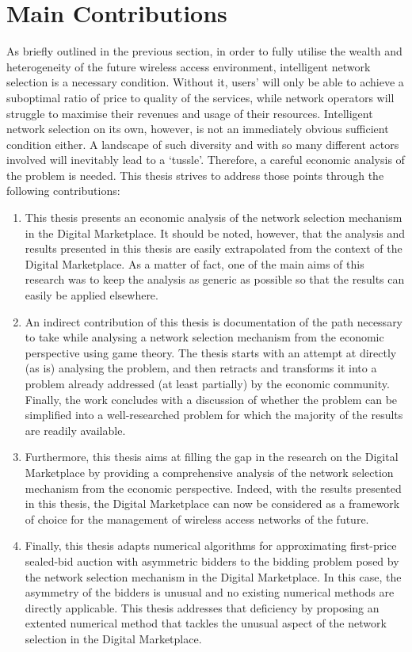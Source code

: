 \section{Main Contributions} %
\label{sec:main_contributions_introduction}
As briefly outlined in the previous section, in order to fully utilise the wealth and heterogeneity of the future wireless access environment, intelligent network selection is a necessary condition. Without it, users' will only be able to achieve a suboptimal ratio of price to quality of the services, while network operators will struggle to maximise their revenues and usage of their resources. Intelligent network selection on its own, however, is not an immediately obvious sufficient condition either. A landscape of such diversity and with so many different actors involved will inevitably lead to a `tussle'. Therefore, a careful economic analysis of the problem is needed. This thesis strives to address those points through the following contributions:
\begin{enumerate}
\item This thesis presents an economic analysis of the network selection mechanism in the Digital Marketplace. It should be noted, however, that the analysis and results presented in this thesis are easily extrapolated from the context of the Digital Marketplace. As a matter of fact, one of the main aims of this research was to keep the analysis as generic as possible so that the results can easily be applied elsewhere.
\item An indirect contribution of this thesis is documentation of the path necessary to take while analysing a network selection mechanism from the economic perspective using game theory. The thesis starts with an attempt at directly (as is) analysing the problem, and then retracts and transforms it into a problem already addressed (at least partially) by the economic community. Finally, the work concludes with a discussion of whether the problem can be simplified into a well-researched problem for which the majority of the results are readily available.
\item Furthermore, this thesis aims at filling the gap in the research on the Digital Marketplace by providing a comprehensive analysis of the network selection mechanism from the economic perspective. Indeed, with the results presented in this thesis, the Digital Marketplace can now be considered as a framework of choice for the management of wireless access networks of the future.
\item Finally, this thesis adapts numerical algorithms for approximating first-price sealed-bid auction with asymmetric bidders to the bidding problem posed by the network selection mechanism in the Digital Marketplace. In this case, the asymmetry of the bidders is unusual and no existing numerical methods are directly applicable. This thesis addresses that deficiency by proposing an extented numerical method that tackles the unusual aspect of the network selection in the Digital Marketplace.
\end{enumerate}

